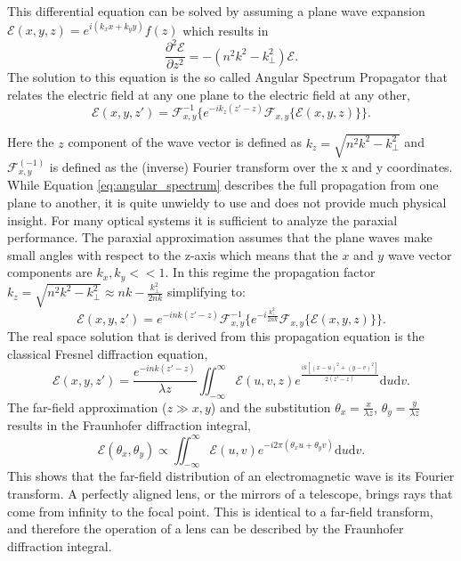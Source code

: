 \documentclass[letterpaper]{ar-1col}
\begin{document}
This differential equation can be solved by assuming a plane wave expansion $\mathcal{E}(x,y,z)=e^{i(k_x x + k_y y)}f(z)$ which results in
\begin{equation}
\frac{\partial^2\mathcal{E}}{\partial z^2} = -(n^2k^2 - k_{\perp}^2)\mathcal{E}.
\end{equation}
The solution to this equation is the so called Angular Spectrum Propagator that relates the electric field at any one plane to the electric field at any other,
\begin{equation}
\label{eq:angular_spectrum}
\mathcal{E}(x, y, z') = \mathcal{F}_{x,y}^{-1}\{e^{-ik_z(z'-z)}\mathcal{F}_{x,y}\{\mathcal{E}(x,y,z)\}\}.
\end{equation}

Here the $z$ component of the wave vector is defined as $k_z=\sqrt{n^2k^2 - k_{\perp}^2}$ and $\mathcal{F}_{x,y}^{(-1)}$ is defined as the (inverse) Fourier transform over the x and y coordinates.
%
While Equation \ref{eq:angular_spectrum} describes the full propagation from one plane to another, it is quite unwieldy to use and does not provide much physical insight.
%
For many optical systems it is sufficient to analyze the paraxial performance.
%
The paraxial approximation assumes that the plane waves make small angles with respect to the z-axis which means that the $x$ and $y$ wave vector components are $k_x,k_y<<1$.
%
In this regime the propagation factor $k_z=\sqrt{n^2k^2 - k_{\perp}^2}\approx nk - \frac{k_{\perp}^2}{2nk}$ simplifying to:
\begin{equation}
\label{eq:angular_spectrum2}
\mathcal{E}(x, y, z') = e^{-ink(z'-z)} \mathcal{F}_{x,y}^{-1}\{ e^{-i\frac{k_{\perp}^2}{2nk}} \mathcal{F}_{x,y}\{\mathcal{E}(x,y,z)\}\}.
\end{equation}
The real space solution that is derived from this propagation equation is the classical Fresnel diffraction equation,
\begin{equation}
\label{eq:fresnel_diffraction}
\mathcal{E}(x, y, z') = \frac{e^{-ink(z'-z)}}{\lambda z} \iint_{-\infty}^{\infty} \mathcal{E}(u, v, z) e^{\frac{ik\left[(x - u)^2 + (y - v)^2\right]}{2 (z' - z)}} \mathrm{d}u \mathrm{d}v.
\end{equation}
The far-field approximation ($z \gg x, y$) and the substitution $\theta_x = \frac{x}{\lambda z}$, $\theta_y = \frac{y}{\lambda z}$ results in the Fraunhofer diffraction integral,
\begin{equation}
\label{eq:fraunhofer_diffraction}
\mathcal{E}(\theta_x, 
\theta_y) \propto \iint_{-\infty}^{\infty} \mathcal{E}(u, v) e^{-i2\pi(\theta_x u + \theta_y v)} \mathrm{d}u \mathrm{d}v.
\end{equation}
This shows that the far-field distribution of an electromagnetic wave is its Fourier transform.
%
A perfectly aligned lens, or the mirrors of a telescope, brings rays that come from infinity to the focal point.
%
This is identical to a far-field transform, and therefore the operation of a lens can be described by the Fraunhofer diffraction integral.
\end{document}
